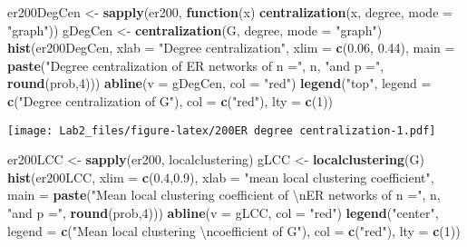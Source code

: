 \documentclass[]{article}
\newenvironment{Shaded}{\begin{snugshade}}{\end{snugshade}}
\newcommand{\KeywordTok}[1]{\textcolor[rgb]{0.13,0.29,0.53}{\textbf{#1}}}
\newcommand{\DataTypeTok}[1]{\textcolor[rgb]{0.13,0.29,0.53}{#1}}
\newcommand{\DecValTok}[1]{\textcolor[rgb]{0.00,0.00,0.81}{#1}}
\newcommand{\FloatTok}[1]{\textcolor[rgb]{0.00,0.00,0.81}{#1}}
\newcommand{\CharTok}[1]{\textcolor[rgb]{0.31,0.60,0.02}{#1}}
\newcommand{\StringTok}[1]{\textcolor[rgb]{0.31,0.60,0.02}{#1}}
\newcommand{\ControlFlowTok}[1]{\textcolor[rgb]{0.13,0.29,0.53}{\textbf{#1}}}
\newcommand{\NormalTok}[1]{#1}
\begin{document}
\begin{Shaded}
\begin{Highlighting}[]
\NormalTok{er200DegCen <-}\StringTok{ }\KeywordTok{sapply}\NormalTok{(er200, }\ControlFlowTok{function}\NormalTok{(x) }\KeywordTok{centralization}\NormalTok{(x, degree, }\DataTypeTok{mode =} \StringTok{"graph"}\NormalTok{))}
\NormalTok{gDegCen <-}\StringTok{ }\KeywordTok{centralization}\NormalTok{(G, degree, }\DataTypeTok{mode =} \StringTok{"graph"}\NormalTok{)}
\KeywordTok{hist}\NormalTok{(er200DegCen, }\DataTypeTok{xlab =} \StringTok{"Degree centralization"}\NormalTok{, }\DataTypeTok{xlim =} \KeywordTok{c}\NormalTok{(}\FloatTok{0.06}\NormalTok{, }\FloatTok{0.44}\NormalTok{), }
     \DataTypeTok{main =} \KeywordTok{paste}\NormalTok{(}\StringTok{"Degree centralization of ER networks of n ="}\NormalTok{, n, }\StringTok{"and p ="}\NormalTok{, }\KeywordTok{round}\NormalTok{(prob,}\DecValTok{4}\NormalTok{)))}
\KeywordTok{abline}\NormalTok{(}\DataTypeTok{v =}\NormalTok{ gDegCen, }\DataTypeTok{col =} \StringTok{"red"}\NormalTok{)}
\KeywordTok{legend}\NormalTok{(}\StringTok{"top"}\NormalTok{, }\DataTypeTok{legend =} \KeywordTok{c}\NormalTok{(}\StringTok{"Degree centralization of G"}\NormalTok{), }\DataTypeTok{col =} \KeywordTok{c}\NormalTok{(}\StringTok{"red"}\NormalTok{), }\DataTypeTok{lty =} \KeywordTok{c}\NormalTok{(}\DecValTok{1}\NormalTok{))}
\end{Highlighting}
\end{Shaded}

\texttt{[image: Lab2\_files/figure-latex/200ER degree centralization-1.pdf]}

\begin{Shaded}
\begin{Highlighting}[]
\NormalTok{er200LCC <-}\StringTok{ }\KeywordTok{sapply}\NormalTok{(er200, localclustering)}
\NormalTok{gLCC <-}\StringTok{ }\KeywordTok{localclustering}\NormalTok{(G)}
\KeywordTok{hist}\NormalTok{(er200LCC, }\DataTypeTok{xlim =} \KeywordTok{c}\NormalTok{(}\FloatTok{0.4}\NormalTok{,}\FloatTok{0.9}\NormalTok{), }\DataTypeTok{xlab =} \StringTok{"mean local clustering coefficient"}\NormalTok{,}
     \DataTypeTok{main =} \KeywordTok{paste}\NormalTok{(}\StringTok{"Mean local clustering coefficient of }\CharTok{\textbackslash{}n}\StringTok{ER networks of n ="}\NormalTok{, n, }\StringTok{"and p ="}\NormalTok{, }\KeywordTok{round}\NormalTok{(prob,}\DecValTok{4}\NormalTok{)))}
\KeywordTok{abline}\NormalTok{(}\DataTypeTok{v =}\NormalTok{ gLCC, }\DataTypeTok{col =} \StringTok{"red"}\NormalTok{)}
\KeywordTok{legend}\NormalTok{(}\StringTok{"center"}\NormalTok{, }\DataTypeTok{legend =} \KeywordTok{c}\NormalTok{(}\StringTok{"Mean local clustering }\CharTok{\textbackslash{}n}\StringTok{coefficient of G"}\NormalTok{), }\DataTypeTok{col =} \KeywordTok{c}\NormalTok{(}\StringTok{"red"}\NormalTok{), }\DataTypeTok{lty =} \KeywordTok{c}\NormalTok{(}\DecValTok{1}\NormalTok{))}
\end{Highlighting}
\end{Shaded}
\end{document}

